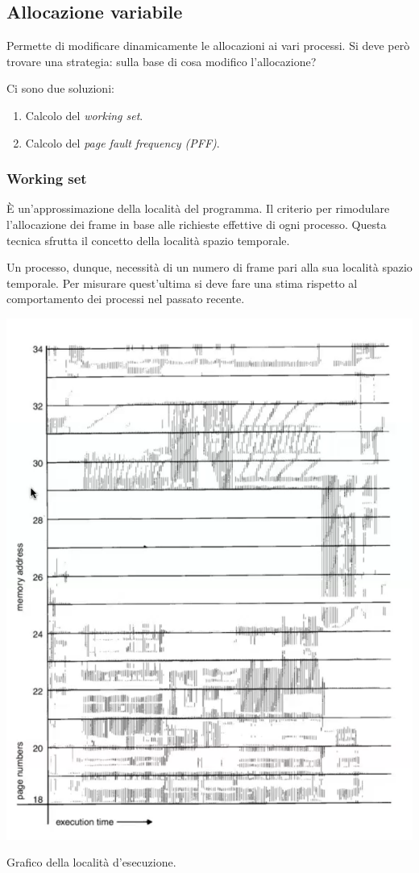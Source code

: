 \documentclass[a4paper,12pt, twoside]{report}
\begin{document}
\subsection{Allocazione variabile}

Permette di modificare dinamicamente le allocazioni ai vari processi. Si deve per\`o trovare una strategia: sulla base di 
cosa modifico l'allocazione? 

Ci sono due soluzioni: 
\begin{enumerate}
    \item Calcolo del \emph{working set}.
    \item Calcolo del \emph{page fault frequency (PFF)}.
\end{enumerate}

\subsubsection{Working set}

\`E un'approssimazione della localit\`a del programma. Il criterio per rimodulare l'allocazione 
dei frame in base alle richieste effettive di ogni processo. Questa tecnica sfrutta il concetto 
della localit\`a spazio temporale. 

Un processo, dunque, necessit\`a di un numero di frame pari alla sua localit\`a spazio temporale. 
Per misurare quest'ultima si deve fare una stima rispetto al comportamento dei processi nel passato 
recente. 

\begin{center}
    \includegraphics[scale=0.2]{working_set}

    \tiny{Grafico della localit\`a d'esecuzione.}
\end{center}
\end{document}
